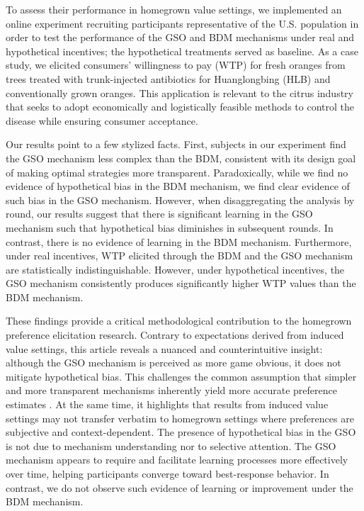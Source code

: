 \documentclass[12pt]{article}
\begin{document}
To assess their performance in homegrown value settings, we implemented an online experiment recruiting participants representative of the U.S. population in order to test the performance of the GSO and BDM mechanisms under real and hypothetical incentives; the hypothetical treatments served as baseline. As a case study, we elicited consumers' willingness to pay (WTP) for fresh oranges from trees treated with trunk-injected antibiotics for Huanglongbing (HLB) and conventionally grown oranges. This application is relevant to the citrus industry that seeks to adopt economically and logistically feasible methods to control the disease while ensuring consumer acceptance. 

Our results point to a few stylized facts. First, subjects in our experiment find the GSO mechanism less complex than the BDM, consistent with its design goal of making optimal strategies more transparent. Paradoxically, while we find no evidence of hypothetical bias in the BDM mechanism, we find clear evidence of such bias in the GSO mechanism. However, when disaggregating the analysis by round, our results suggest that there is significant learning in the GSO mechanism such that hypothetical bias diminishes in subsequent rounds. In contrast, there is no evidence of learning in the BDM mechanism.
Furthermore, under real incentives, WTP elicited through the BDM and the GSO mechanism are statistically indistinguishable. However, under hypothetical incentives, the GSO mechanism consistently produces significantly higher WTP values than the BDM mechanism.

These findings provide a critical methodological contribution to the homegrown preference elicitation research. Contrary to expectations derived from induced value settings, this article reveals a nuanced and counterintuitive insight: although the GSO mechanism is perceived as more game obvious, it does not mitigate hypothetical bias. This challenges the common assumption that simpler and more transparent mechanisms inherently yield more accurate preference estimates \citep{li_obviously_2017}. At the same time, it highlights that results from induced value settings may not transfer verbatim to homegrown settings where preferences are subjective and context-dependent. The presence of hypothetical bias in the GSO is not due to mechanism understanding nor to selective attention. The GSO mechanism appears to require and facilitate learning processes more effectively over time, helping participants converge toward best-response behavior. In contrast, we do not observe such evidence of learning or improvement under the BDM mechanism.
\end{document}
